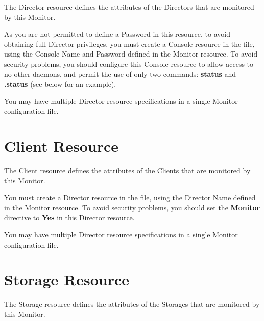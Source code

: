 The Director resource defines the attributes of the Directors that are
monitored by this Monitor.

As you are not permitted to define a Password in this resource, to avoid
obtaining full Director privileges, you must create a Console resource in the
 file, using the
Console Name and Password defined in the Monitor resource. To avoid security
problems, you should configure this Console resource to allow access to no
other daemons, and permit the use of only two commands: {\bf status} and {\bf
.status} (see below for an example).

You may have multiple Director resource specifications in a single Monitor
configuration file.





\section{Client Resource}
\label{ClientResource1}

The Client resource defines the attributes of the Clients that are monitored
by this Monitor.

You must create a Director resource in the
 file, using the
Director Name defined in the Monitor resource. To avoid security problems, you
should set the {\bf Monitor} directive to {\bf Yes} in this Director resource.


You may have multiple Director resource specifications in a single Monitor
configuration file.





\section{Storage Resource}
\label{StorageResource1}

The Storage resource defines the attributes of the Storages that are monitored
by this Monitor.

